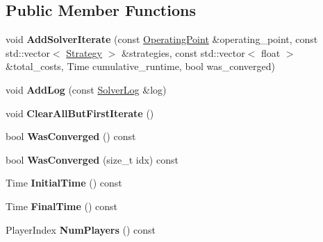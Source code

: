 \subsection*{Public Member Functions}
\begin{DoxyCompactItemize}
\item 
void {\bfseries Add\+Solver\+Iterate} (const \hyperlink{structilqgames_1_1_operating_point}{Operating\+Point} \&operating\+\_\+point, const std\+::vector$<$ \hyperlink{structilqgames_1_1_strategy}{Strategy} $>$ \&strategies, const std\+::vector$<$ float $>$ \&total\+\_\+costs, Time cumulative\+\_\+runtime, bool was\+\_\+converged)\hypertarget{classilqgames_1_1_solver_log_abbd4f1c7a064c3ae772633762d60a11e}{}\label{classilqgames_1_1_solver_log_abbd4f1c7a064c3ae772633762d60a11e}

\item 
void {\bfseries Add\+Log} (const \hyperlink{classilqgames_1_1_solver_log}{Solver\+Log} \&log)\hypertarget{classilqgames_1_1_solver_log_ae0b4da5de15e8a03a0c64e79db9fb60d}{}\label{classilqgames_1_1_solver_log_ae0b4da5de15e8a03a0c64e79db9fb60d}

\item 
void {\bfseries Clear\+All\+But\+First\+Iterate} ()\hypertarget{classilqgames_1_1_solver_log_aeb7c725598ed426c4428bd51ceaa0931}{}\label{classilqgames_1_1_solver_log_aeb7c725598ed426c4428bd51ceaa0931}

\item 
bool {\bfseries Was\+Converged} () const \hypertarget{classilqgames_1_1_solver_log_a1555d4b57427b3449c28e87a4b999905}{}\label{classilqgames_1_1_solver_log_a1555d4b57427b3449c28e87a4b999905}

\item 
bool {\bfseries Was\+Converged} (size\+\_\+t idx) const \hypertarget{classilqgames_1_1_solver_log_ace7a4654de1ca7e4250ebe3a93adad28}{}\label{classilqgames_1_1_solver_log_ace7a4654de1ca7e4250ebe3a93adad28}

\item 
Time {\bfseries Initial\+Time} () const \hypertarget{classilqgames_1_1_solver_log_aaaf83583b07bc9b9974ff0a21b11129b}{}\label{classilqgames_1_1_solver_log_aaaf83583b07bc9b9974ff0a21b11129b}

\item 
Time {\bfseries Final\+Time} () const \hypertarget{classilqgames_1_1_solver_log_a7d4f0d183aaa7f5a0a0818a301f4994f}{}\label{classilqgames_1_1_solver_log_a7d4f0d183aaa7f5a0a0818a301f4994f}

\item 
Player\+Index {\bfseries Num\+Players} () const \hypertarget{classilqgames_1_1_solver_log_af2b335909e75f63a910f4f734890d4d7}{}\label{classilqgames_1_1_solver_log_af2b335909e75f63a910f4f734890d4d7}


\end{DoxyCompactItemize}

